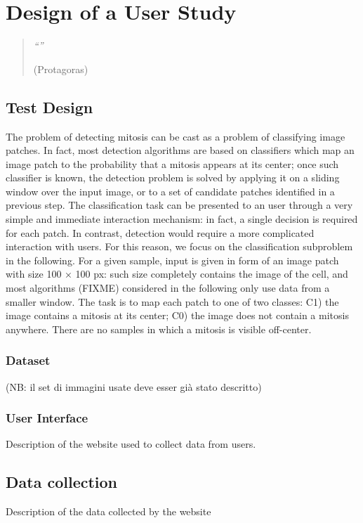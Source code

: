 \chapter{Design of a User Study}
\label{chapter5}
\thispagestyle{empty}

\begin{quotation}
{\footnotesize
\noindent \emph{``''}
\begin{flushright}
 (Protagoras) 
\end{flushright}
}
\end{quotation}

\vspace{0.5cm}


\section{Test Design}

The problem of detecting mitosis can be cast as a problem of classifying image
patches. In fact, most detection algorithms are based on classifiers which map
an image patch to the probability that a mitosis appears at its center; once such
classifier is known, the detection problem is solved by applying it on a sliding
window over the input image, or to a set of candidate patches identified in a
previous step.
The classification task can be presented to an user through a very simple and immediate interaction mechanism: in fact, a single decision is required for each
patch. In contrast, detection would require a more complicated interaction with
users. For this reason, we focus on the classification subproblem in the following.
For a given sample, input is given in form of an image patch with size 100 × 100
px: such size completely contains the image of the cell, and most algorithms
(FIXME) considered in the following only use data from a smaller window. The
task is to map each patch to one of two classes: C1) the image contains a mitosis
at its center; C0) the image does not contain a mitosis anywhere. There are no
samples in which a mitosis is visible off-center.


\subsection{Dataset}

(NB: il set di immagini usate deve esser già stato descritto)

\subsection{User Interface}

Description of the website used to collect data from users.

\vspace{0.5cm}

\section{Data collection}

Description of the data collected by the website
